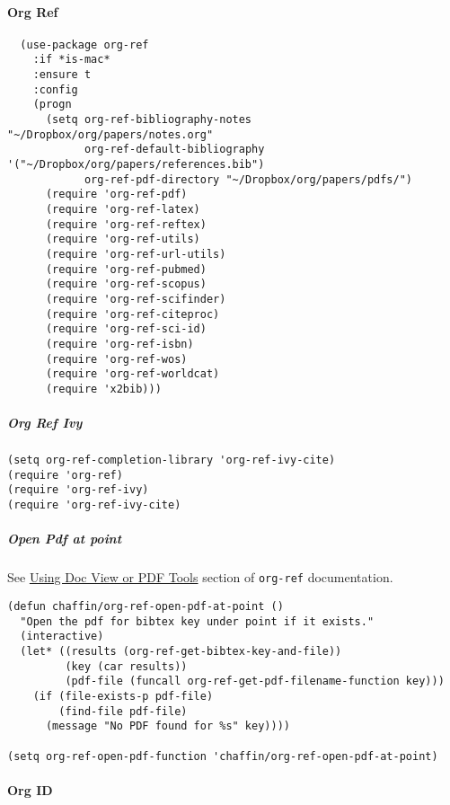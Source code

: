 \documentclass[11pt]{article}
\begin{document}
\paragraph*{Org Ref}
\label{sec:org1457968}

\begin{verbatim}
  (use-package org-ref
    :if *is-mac*
    :ensure t
    :config
    (progn
      (setq org-ref-bibliography-notes "~/Dropbox/org/papers/notes.org"
            org-ref-default-bibliography '("~/Dropbox/org/papers/references.bib")
            org-ref-pdf-directory "~/Dropbox/org/papers/pdfs/")
      (require 'org-ref-pdf)
      (require 'org-ref-latex)
      (require 'org-ref-reftex)
      (require 'org-ref-utils)
      (require 'org-ref-url-utils)
      (require 'org-ref-pubmed)
      (require 'org-ref-scopus)
      (require 'org-ref-scifinder)
      (require 'org-ref-citeproc)
      (require 'org-ref-sci-id)
      (require 'org-ref-isbn)
      (require 'org-ref-wos)
      (require 'org-ref-worldcat)
      (require 'x2bib)))
\end{verbatim}

\subparagraph*{Org Ref Ivy}
\label{sec:org4a9ee6e}

\begin{verbatim}
(setq org-ref-completion-library 'org-ref-ivy-cite)
(require 'org-ref)
(require 'org-ref-ivy)
(require 'org-ref-ivy-cite)
\end{verbatim}

\subparagraph*{Open Pdf at point}
\label{sec:org442fd21}

See \href{https://github.com/jkitchin/org-ref/blob/master/org-ref.org\#using-doc-view-or-pdf-tools}{Using Doc View or PDF Tools} section of \texttt{org-ref} documentation.

\begin{verbatim}
(defun chaffin/org-ref-open-pdf-at-point ()
  "Open the pdf for bibtex key under point if it exists."
  (interactive)
  (let* ((results (org-ref-get-bibtex-key-and-file))
         (key (car results))
         (pdf-file (funcall org-ref-get-pdf-filename-function key)))
    (if (file-exists-p pdf-file)
        (find-file pdf-file)
      (message "No PDF found for %s" key))))

(setq org-ref-open-pdf-function 'chaffin/org-ref-open-pdf-at-point)

\end{verbatim}

\paragraph*{Org ID}
\label{sec:org3fe091f}
\end{document}
